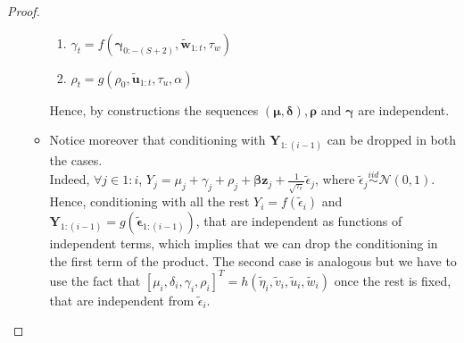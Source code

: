 \documentclass[11pt,twoside]{report}
\begin{document}
\begin{proof}
\begin{enumerate}
\begin{itemize}
\begin{enumerate}
		\item  $\gamma_t = f(\boldsymbol{\gamma}_{0:-(S+2)},\tilde{\mathbf{w}}_{1:t}, \tau_w)$
		\item $\rho_t = g(\rho_0,\tilde{\mathbf{u}}_{1:t}, \tau_u, \alpha)$
	\end{enumerate}
	Hence, by constructions the sequences $ (\boldsymbol{\mu}, \boldsymbol{\delta}),\boldsymbol{\rho}$ and $ \boldsymbol{\gamma} $ are independent.
	\item Notice moreover that conditioning with $ \mathbf{Y}_{1:(i-1)} $ can be dropped in both the cases.\\
	Indeed, $ \forall j \in 1:i $, $ Y_j  = \mu_j+ \gamma_j +\rho_j + \boldsymbol{\beta}\mathbf{z}_j + \frac{1}{\sqrt{\tau_\epsilon}}\tilde{\epsilon}_j$, where $\tilde{\epsilon}_j \overset{iid}{\sim}\mathcal{N}(0,1)  $. Hence, conditioning with all the rest $ Y_i = f(\tilde{\epsilon}_i) $ and $\mathbf{Y}_{1:(i-1)} = g(\tilde{\boldsymbol{\epsilon}}_{1:(i-1)} ) $, that are independent as functions of independent terms, which implies that we can drop the conditioning in the first term of the product. The second case is analogous but we have to use the fact that $[\mu_i, \delta_i, \gamma_i, \rho_i]^T = h(\tilde{\eta}_i, \tilde{v}_i, \tilde{u}_i, \tilde{w}_i) $ once the rest is fixed, that are independent from $ \tilde{\epsilon}_i $.
\end{itemize}


\end{enumerate}
\end{proof}
\end{document}
